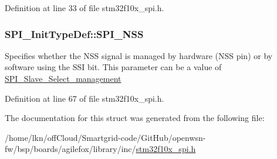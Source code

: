 Definition at line 33 of file stm32f10x\+\_\+spi.\+h.

\subsubsection[{\texorpdfstring{S\+P\+I\+\_\+\+N\+SS}{SPI_NSS}}]{ S\+P\+I\+\_\+\+Init\+Type\+Def\+::\+S\+P\+I\+\_\+\+N\+SS}\hypertarget{struct_s_p_i___init_type_def_a6c1ea4b5e3d147b74799efa42e3903c6}{}\label{struct_s_p_i___init_type_def_a6c1ea4b5e3d147b74799efa42e3903c6}
Specifies whether the N\+SS signal is managed by hardware (N\+SS pin) or by software using the S\+SI bit. This parameter can be a value of \hyperlink{group___s_p_i___slave___select__management}{S\+P\+I\+\_\+\+Slave\+\_\+\+Select\+\_\+management} 

Definition at line 67 of file stm32f10x\+\_\+spi.\+h.



The documentation for this struct was generated from the following file\+:\begin{DoxyCompactItemize}
\item 
/home/lkn/off\+Cloud/\+Smartgrid-\/code/\+Git\+Hub/openwsn-\/fw/bsp/boards/agilefox/library/inc/\hyperlink{agilefox_2library_2inc_2stm32f10x__spi_8h}{stm32f10x\+\_\+spi.\+h}\end{DoxyCompactItemize}
